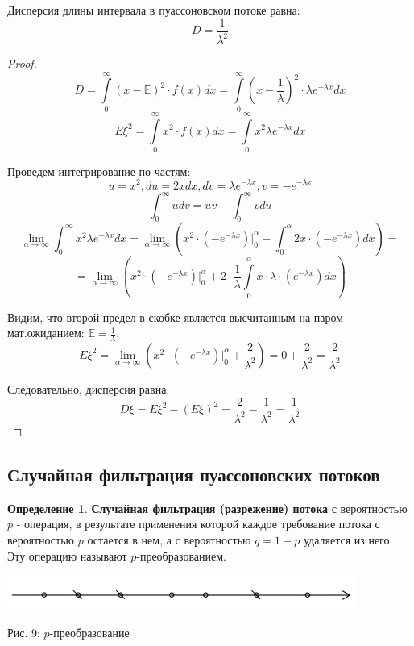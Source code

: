 \documentclass[aps,%
12pt,%
final,%
oneside,
onecolumn,%
musixtex, %
superscriptaddress,%
centertags]{article} %
\theoremstyle{plain}
\theoremstyle{definition}
\newtheorem{definition}{Определение}[subsection]
\theoremstyle{remark}
\begin{document}
Дисперсия длины интервала в пуассоновском потоке равна:
$$D = \frac{1}{\lambda^2}$$

\begin{proof}
	$$D = \int\limits_{0}^{\infty} (x - \mathbb{E} )^2 \cdot f(x) dx =  \int\limits_{0}^{\infty} \left (x - \frac{1}{\lambda} \right)^2 \cdot \lambda e^{-\lambda x} dx$$
	$$E \xi^2 = \int\limits_{0}^{\infty} x^2 \cdot f(x) dx = \int\limits_{0}^{\infty} x^2 \lambda e^{-\lambda x} dx $$

	Проведем интегрирование по частям:
	$$ u = x^2, du = 2xdx, dv = \lambda e^{-\lambda x}, v = -e^{-\lambda x}$$
	$$ \int_{0}^{\infty} udv = uv - \int_{0}^{\infty} vdu$$
	$$\lim\limits_{\alpha \to \infty} \int_{0}^{\infty} x^2 \lambda e^{-\lambda x} dx = \lim\limits_{\alpha \to \infty} \left (x^2 \cdot (-e^{-\lambda x}) |^{\alpha}_{0} -  \int_{0}^{\alpha} 2x\cdot (-e^{-\lambda x}) dx \right ) = $$
	$$ = \lim\limits_{\alpha \to \infty} \left (x^2 \cdot (-e^{-\lambda x}) |^{\alpha}_{0} + 2 \cdot \frac{1}{\lambda} \int\limits_{0}^{\alpha} x \cdot \lambda\cdot (e^{-\lambda x}) dx \right )$$

	Видим, что второй предел в скобке является высчитанным на паром мат.ожиданием: $\mathbb{E} = \frac{1}{\lambda}$.
	$$E \xi^2 = \lim\limits_{\alpha \to \infty} \left (x^2 \cdot (-e^{-\lambda x}) |^{\alpha}_{0} + \frac{2}{\lambda^2} \right ) = 0 + \frac{2}{\lambda^2} = \frac{2}{\lambda^2}$$

	Следовательно, дисперсия равна:
	$$ D \xi = E \xi^2 - (E \xi)^2 = \frac{2}{\lambda^2} - \frac{1}{\lambda^2} = \frac{1}{\lambda^2}$$
\end{proof}

\newpage
\subsection{Случайная фильтрация пуассоновских потоков}

\begin{definition}
	\textbf{Случайная фильтрация (разрежение) потока} с вероятностью $p$ - операция, в результате применения которой каждое требование потока с вероятностью $p$ остается в нем, а с вероятностью $q=1-p$ удаляется из него. Эту операцию называют $p$-преобразованием.
\end{definition}

\begin{center}
  \includegraphics[scale=0.6]{images/9.png}

  Рис. 9: $p$-преобразование
\end{center}
\end{document}
